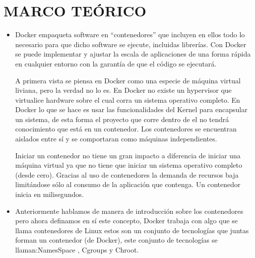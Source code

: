 \documentclass[preprint,12pt]{elsarticle}
\begin{document}
\section{MARCO TEÓRICO}
\begin{itemize}
\item Docker empaqueta software en “contenedores” que incluyen en ellos todo lo necesario para que dicho software se ejecute, incluidas librerías. Con Docker se puede implementar y ajustar la escala de aplicaciones de una forma rápida en cualquier entorno con la garantía de que el código se ejecutará.

A primera vista se piensa en Docker como una especie de máquina virtual liviana, pero la verdad no lo es. En Docker no existe un hypervisor que virtualice hardware sobre el cual corra un sistema operativo completo. En Docker lo que se hace es usar las funcionalidades del Kernel para encapsular un sistema, de esta forma el proyecto que corre dentro de el no tendrá conocimiento que está en un contenedor. Los contenedores se encuentran aislados entre sí y se comportaran como máquinas independientes.

Iniciar un contenedor no tiene un gran impacto a diferencia de iniciar una máquina virtual ya que no tiene que iniciar un sistema operativo completo (desde cero). Gracias al uso de contenedores la demanda de recursos baja limitándose sólo al consumo de la aplicación que contenga. Un contenedor inicia en milisegundos.
\item Anteriormente hablamos de manera de introducción sobre los contenedores pero ahora definamos en sí este concepto, Docker trabaja con algo que se llama contenedores de Linux estos son un conjunto de tecnologías que juntas forman un contenedor (de Docker), este conjunto de tecnologías se llaman:NamesSpace , Cgroups y Chroot.
\end{itemize}

\end{document}

